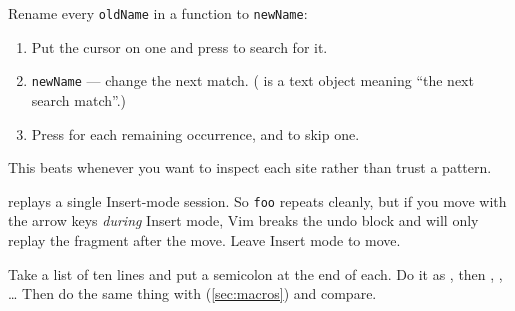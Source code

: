 \begin{eg}
	Rename every \texttt{oldName} in a function to \texttt{newName}:
	\begin{enumerate}[(1)]
		\item Put the cursor on one and press \key{*} to search for it.
		\item {}   \texttt{newName}  --- change the next
		      match. (  is a text object meaning ``the next search match''.)
		\item Press  for each remaining occurrence, and  to skip one.
	\end{enumerate}
	This beats  whenever you want to inspect each site
	rather than trust a pattern.
\end{eg}

\begin{note}
	 replays a single Insert-mode session. So   \texttt{foo}
	 repeats cleanly, but if you move with the arrow keys \emph{during}
	Insert mode, Vim breaks the undo block and  will only replay the
	fragment after the move. Leave Insert mode to move.
\end{note}

\begin{tryit}
	Take a list of ten lines and put a semicolon at the end of each. Do it as
	 \key{;}  , then  ,  ,
	\dots{} Then do the same thing with   (\autoref{sec:macros}) and
	compare.
\end{tryit}
